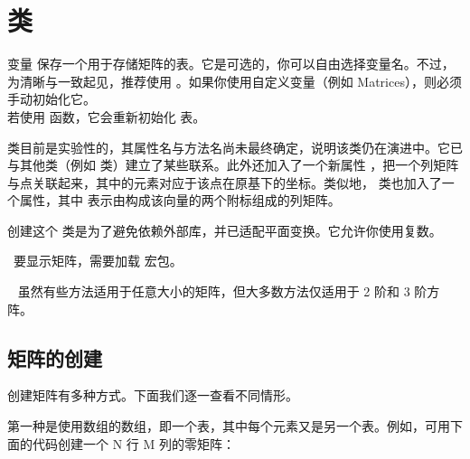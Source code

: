 \newpage\section{ 类}

变量  保存一个用于存储矩阵的表。它是可选的，你可以自由选择变量名。不过，为清晰与一致起见，推荐使用 。如果你使用自定义变量（例如 Matrices），则必须手动初始化它。\\
若使用  函数，它会重新初始化  表。

\vspace{1em}

 类目前是实验性的，其属性名与方法名尚未最终确定，说明该类仍在演进中。它已与其他类（例如  类）建立了某些联系。此外还加入了一个新属性 ，把一个列矩阵与点关联起来，其中的元素对应于该点在原基下的坐标。类似地， 类也加入了一个属性，其中  表示由构成该向量的两个附标组成的列矩阵。

创建这个  类是为了避免依赖外部库，并已适配平面变换。它允许你使用复数。

\lefthand\ 要显示矩阵，需要加载  宏包。

{\color{red}\lefthand\ } 虽然有些方法适用于任意大小的矩阵，但大多数方法仅适用于 2 阶和 3 阶方阵。


\subsection{矩阵的创建}
\label{sub:matrix_creation}

创建矩阵有多种方式。下面我们逐一查看不同情形。

第一种是使用数组的数组，即一个表，其中每个元素又是另一个表。例如，可用下面的代码创建一个 N 行 M 列的零矩阵：



